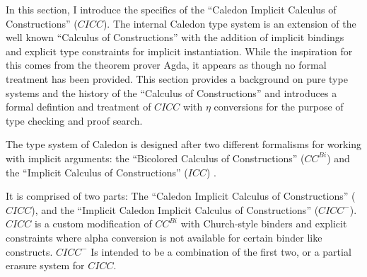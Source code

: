 In this section, I introduce the specifics of the ``Caledon Implicit Calculus of Constructions'' ($CICC$).
The internal Caledon type system is an extension of the well known ``Calculus of Constructions'' with the 
addition of implicit bindings and explicit type constraints for implicit instantiation.  
While the inspiration for this comes from the theorem prover Agda, 
it appears as though no formal treatment
has been provided. This section provides a background on pure type systems 
and the history of the ``Calculus of Constructions''
and introduces a formal defintion and treatment of $CICC$ with 
$\eta$ conversions for the purpose of type checking
and proof search.

The type system of Caledon is designed after two different formalisms for working with implicit arguments:  
the ``Bicolored Calculus of Constructions'' ($CC^{Bi}$) \citep{luther2001more} and 
the ``Implicit Calculus of Constructions'' ($ICC$) \citep{miquel2001implicit}.

It is comprised of two parts: The ``Caledon Implicit Calculus of Constructions'' ($CICC$), 
and the ``Implicit Caledon Implicit Calculus of Constructions'' ($CICC^-$). 
$CICC$ is a custom modification of $CC^{Bi}$ with Church-style binders and explicit constraints 
where alpha conversion is not available for certain binder like constructs.
$CICC^-$ Is intended to be a combination of the first two, or a partial 
erasure system for $CICC$. 
